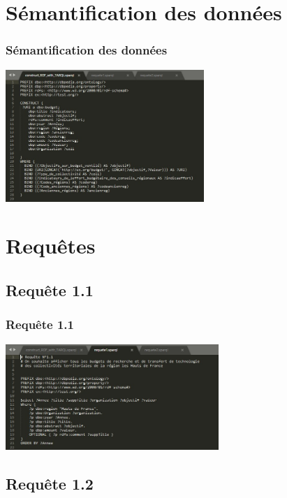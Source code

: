 \documentclass[12pt]{beamer}
\begin{document}
		
	\section{Sémantification des données}
	
		\begin{frame}
			
			\frametitle{Sémantification des données}
					
			\centering\includegraphics[height=5cm]{picture/construct.jpg}
				
		\end{frame}
		
	\section{Requêtes}
	
		\subsection{Requête 1.1}
		
			\begin{frame}
				
				\frametitle{Requête 1.1}
				
				\centering\includegraphics[height=4cm]{picture/requete11.jpg}
					
			\end{frame}		
	

		\subsection{Requête 1.2}
		
\end{document}

